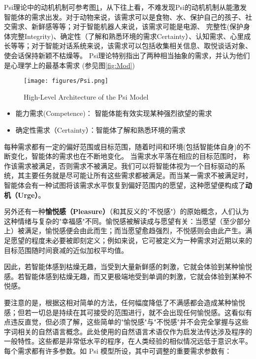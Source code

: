 Psi理论中的动机机制可参考图\ref{fig:Psi}，从下往上看，不难发现Psi的动机机制从能激发智能体的需求出发。对于动物来说，该需求可以是食物、水、保护自己的孩子、社交需求、新鲜感等等；对于智能机器人来说，该需求可能是电源、 完整性(保护身体完整Integrity)、确定性（了解和熟悉环境的需求Certainty）、认知需求、心里成长等等；对于智能对话系统来说，该需求可以包括收集相关信息、取悦谈话对象、使会话保持新颖不枯燥等。
Psi理论特别指出了两种相当抽象的需求，并认为他们是心理学上的最基本需求 (参见图\ref{fig:Mod})

\begin{figure}[htb]
\centering
\texttt{[image: figures/Psi.png]}
\caption{High-Level Architecture of the Psi Model}
\label{fig:Psi}
\end{figure}

\begin{itemize}
\item 能力需求(Competence)：  智能体能有效实现某种强烈欲望的需求
\item 确定性需求（Certainty）：智能体了解和熟悉环境的需求 
\end{itemize}

每种需求都有一定的偏好范围或目标范围，随着时间和环境(包括智能体自身)的不断变化，智能体的需求也在不断地变化。 当需求水平落在相应的目标范围时，
称作该需求被满足，否则需求不被满足。我们可以将智能体视为一个目标驱动的系统，其主要任务就是尽可能让所有这些需求都被满足。而当某一需求不被满足时，智能体会有一种试图将该需求水平恢复到偏好范围内的愿望，这种愿望便构成了{\bf 动机（Urge）}。


另外还有一种{\bf 愉悦感（Pleasure）}（和其反义的"不悦感"）的原始概念，人们认为这种情绪与复杂的"幸福感"不同。愉悦感被解读成与愿望有关：当愿望（至少部分上）被满足，愉悦感便会由此而生；而当愿望愈趋强烈，不悦感则会由此产生。满足愿望的程度未必要被即刻定义；例如来说，它可被定义为一种需求对近期以来的目标范围随时间衰减的近似加权平均值。

因此，若智能体感到枯燥无趣，当受到大量新鲜感的刺激，它就会体验到某种愉悦感。若智能体感到枯燥无趣，而又更极端地受到单调的刺激，它就会体验到某种不悦感。

要注意的是，根据这相对简单的方法，任何幅度降低了不满感都会造成某种愉悦感；但若一切总是持续在其可接受的范围进行，就不会出现任何愉悦感。这看似有点违反直觉，但必须了解，这些简单的"愉悦感"与"不悦感"并不会完全掌握与这些字词相关的自然语言概念。此处使用的自然语言术语仅作为启发法传达涉及程序的一般特性。这些都是非常低水平的程序，在人类经验的相似情况远低于意识水平。
每个需求都有许多参数。如 Psi 模型所设，其中可调整的重要需求参数有：

